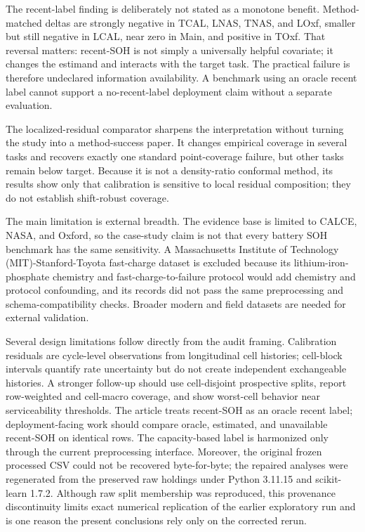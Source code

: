 \documentclass[
  number,
  preprint]{elsarticle}
\begin{document}
The recent-label finding is deliberately not stated as a monotone
benefit. Method-matched deltas are strongly negative in TCAL, LNAS,
TNAS, and LOxf, smaller but still negative in LCAL, near zero in Main,
and positive in TOxf. That reversal matters: recent-SOH is not simply a
universally helpful covariate; it changes the estimand and interacts
with the target task. The practical failure is therefore undeclared
information availability. A benchmark using an oracle recent label
cannot support a no-recent-label deployment claim without a separate
evaluation.

The localized-residual comparator sharpens the interpretation without
turning the study into a method-success paper. It changes empirical
coverage in several tasks and recovers exactly one standard
point-coverage failure, but other tasks remain below target. Because it
is not a density-ratio conformal method, its results show only that
calibration is sensitive to local residual composition; they do not
establish shift-robust coverage.

The main limitation is external breadth. The evidence base is limited to
CALCE, NASA, and Oxford, so the case-study claim is not that every
battery SOH benchmark has the same sensitivity. A Massachusetts
Institute of Technology (MIT)-Stanford-Toyota fast-charge dataset
\citep{severson2019datadriven} is excluded because its
lithium-iron-phosphate chemistry and fast-charge-to-failure protocol
would add chemistry and protocol confounding, and its records did not
pass the same preprocessing and schema-compatibility checks. Broader
modern and field datasets are needed for external validation.

Several design limitations follow directly from the audit framing.
Calibration residuals are cycle-level observations from longitudinal
cell histories; cell-block intervals quantify rate uncertainty but do
not create independent exchangeable histories. A stronger follow-up
should use cell-disjoint prospective splits, report row-weighted and
cell-macro coverage, and show worst-cell behavior near serviceability
thresholds. The article treats recent-SOH as an oracle recent label;
deployment-facing work should compare oracle, estimated, and unavailable
recent-SOH on identical rows. The capacity-based label is harmonized
only through the current preprocessing interface. Moreover, the original
frozen processed CSV could not be recovered byte-for-byte; the repaired
analyses were regenerated from the preserved raw holdings under Python
3.11.15 and scikit-learn 1.7.2. Although raw split membership was
reproduced, this provenance discontinuity limits exact numerical
replication of the earlier exploratory run and is one reason the present
conclusions rely only on the corrected rerun.
\end{document}
